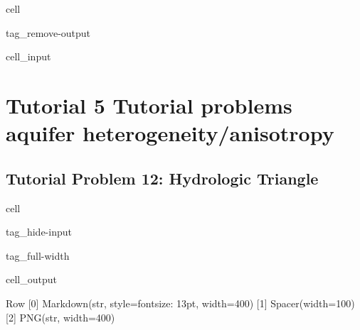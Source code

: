 \documentclass[letterpaper,10pt,english]{jupyterBook}
\begin{document}
\begin{sphinxuseclass}{cell}
\begin{sphinxuseclass}{tag_remove-output}\begin{sphinxVerbatimInput}

\begin{sphinxuseclass}{cell_input}
\begin{sphinxVerbatim}[commandchars=\\\{\}]
   
   
   
  
\end{sphinxVerbatim}

\end{sphinxuseclass}\end{sphinxVerbatimInput}

\end{sphinxuseclass}
\end{sphinxuseclass}

\chapter{Tutorial 5 \sphinxhyphen{} Tutorial problems aquifer heterogeneity/anisotropy}
\label{\detokenize{content/tutorials/T5/tutorial_05:tutorial-5-tutorial-problems-aquifer-heterogeneity-anisotropy}}\label{\detokenize{content/tutorials/T5/tutorial_05::doc}}

\section{Tutorial Problem 12: Hydrologic Triangle}
\label{\detokenize{content/tutorials/T5/tutorial_05:tutorial-problem-12-hydrologic-triangle}}
\begin{sphinxuseclass}{cell}
\begin{sphinxuseclass}{tag_hide-input}
\begin{sphinxuseclass}{tag_full-width}\begin{sphinxVerbatimOutput}

\begin{sphinxuseclass}{cell_output}
\begin{sphinxVerbatim}[commandchars=\\\{\}]
Row
    [0] Markdown(str, style=\PYGZob{}\PYGZsq{}font\PYGZhy{}size\PYGZsq{}: \PYGZsq{}13pt\PYGZsq{}\PYGZcb{}, width=400)
    [1] Spacer(width=100)
    [2] PNG(str, width=400)
\end{sphinxVerbatim}

\end{sphinxuseclass}\end{sphinxVerbatimOutput}

\end{sphinxuseclass}
\end{sphinxuseclass}
\end{sphinxuseclass}
\end{document}
